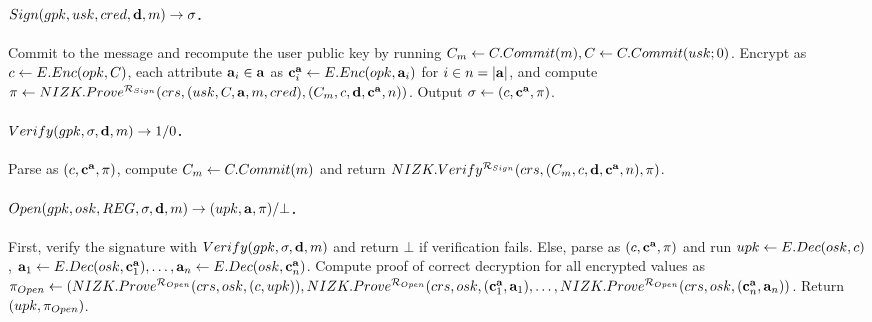 \iffalse

\todo{This is not consistent with the $\langle \SBCMCom,\SBCMSign \rangle$
  definition...}
  
\begin{itemize}
\item \underline{User}: Commit to the user secret key by running $\Ccom \gets
  \CCommit(\usk)$. Generate proof $\NIZKproof \gets
  \NIZKProve^{\NIZKRel_{\Issue}}(\NIZKcrs,\usk,\Ccom)$. Send $(\Ccom,
  \NIZKproof)$ to the issuer.
\item \underline{Issuer}: Run $\NIZKVerify^{\NIZKRel_{\Issue}}(\NIZKcrs,
  \C,\NIZKproof)$, and return $\bot$ if it fails. Else, create the credential
  by computing $\SBCMsig \gets \SBCMSign(\isk,\C,\attrs)$. Send \SBCMsig to the
  user, and output $\utrans \gets (\C,\SBCMsig,\attrs,\NIZKproof)$.
\item \underline{User}: Check the signature by running $\SBCMVerify(\ipk,
  \SBCMsig,\attrs \cup \lbrace \usk \rbrace)$, and return $\bot$ if
  verification fails. Otherwise, return $\cred \gets \SBCMsig$.
\end{itemize}
\fi

\paragraph{$Sign(gpk,usk,cred,\mathbf{d},m) \rightarrow \sigma$.} %
Commit to the message and recompute the user public key by running
$C_{m} \gets C.Commit(m), C \gets C.Commit(usk; 0)$.
Encrypt \Ccom as $c \gets E.Enc(opk,C)$, each attribute $\mathbf{a}_i \in
\mathbf{a}$ as $\mathbf{c}^{\mathbf{a}}_i \gets E.Enc(opk,\mathbf{a}_i)$ for $i \in n =
|\mathbf{a}|$, and compute  $\pi \gets
NIZK.Prove^{\mathcal{R}_{Sign}}(crs,(usk,C,\mathbf{a},m,cred),(C_{m},
c,\mathbf{d},\mathbf{c}^{\mathbf{a}},n))$. Output $\sigma \gets (c,\mathbf{c}^{\mathbf{a}},
\pi)$.

\paragraph{$Verify(gpk,\sigma,\mathbf{d},m) \rightarrow 1/0$.} %
Parse \sig as $(c,\mathbf{c}^{\mathbf{a}},\pi)$, compute $C_{m} \gets
C.Commit(m)$ and return $NIZK.Verify^{\mathcal{R}_{Sign}}(crs,(C_{m},c,
\mathbf{d},\mathbf{c}^{\mathbf{a}},n),\pi)$.

\paragraph{$\Open(\gpk,\osk,\trans,\sig,\dattrs,\msg)
  \rightarrow (\upk,\attrs,\oproof)/\bot$.} %
First, verify the signature with $Verify(gpk,\sigma,\mathbf{d},m)$ and
return $\bot$ if verification fails. Else, parse \sig as $(c,\mathbf{c}^{\mathbf{a}},
\pi)$ and run $upk \gets E.Dec(osk,c)$, $\mathbf{a}_1 \gets E.Dec(osk,
\mathbf{c}_1^{\mathbf{a}}), \dots, \mathbf{a}_n \gets E.Dec(osk,\mathbf{c}_n^{\mathbf{a}})$. Compute
proof of correct decryption for all encrypted values as
$\pi_{Open} \gets (NIZK.Prove^{\mathcal{R}_{Open}}(crs,osk,(c,
upk)),NIZK.Prove^{\mathcal{R}_{Open}}(crs,osk,(\mathbf{c}_1^{\mathbf{a}},\mathbf{a}_1),
\dots,NIZK.Prove^{\mathcal{R}_{Open}}(crs,osk,(\mathbf{c}_n^{\mathbf{a}},\mathbf{a}_n))$.
Return $(upk,\pi_{Open})$.

